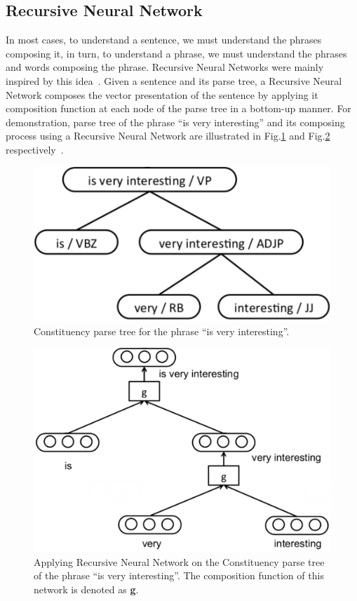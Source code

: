 \subsection{Recursive Neural Network}
In most cases, to understand a sentence, we must understand the phrases composing it, in turn, to understand a phrase, we must understand the phrases and words composing the phrase.
Recursive Neural Networks were mainly inspired by this idea~\cite{treeLSTM}.
Given a sentence and its parse tree, a Recursive Neural Network composes the vector presentation of the sentence by applying it composition function at each node of the parse tree in a bottom-up manner.
For demonstration, parse tree of the phrase ``is very interesting'' and its composing process using a Recursive Neural Network are illustrated in Fig.\ref{fig:example-parse} and Fig.\ref{fig:example-compose} respectively~\cite{tag-embedding-rnn}.
\begin{figure}[] 
	\centering
	\includegraphics[scale=0.4]{figure/example-parse}
	\caption[Constituency parse tree for the phrase ``is very interesting'']{Constituency parse tree for the phrase ``is very interesting''.}
	\label{fig:example-parse}
\end{figure}
\begin{figure}[]
	\centering
	\includegraphics[scale=0.3]{figure/example-compose}
	\caption[Applying Recursive Neural Network on the phrase ``is very interesting'']{Applying Recursive Neural Network on the Constituency parse tree of the phrase ``is very interesting''.
		The composition function of this network is denoted as \textbf{g}.}
	\label{fig:example-compose}
\end{figure}


